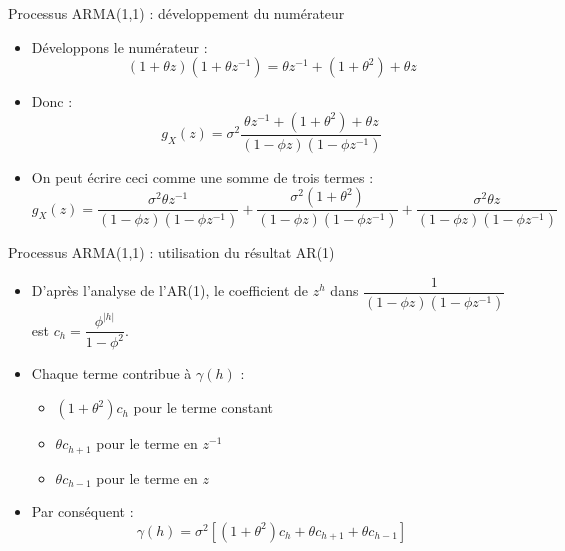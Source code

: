 \documentclass[11pt,aspectratio=169]{beamer}
\begin{document}
\begin{frame}{Processus ARMA(1,1) : développement du numérateur}

\begin{itemize}

\item Développons le numérateur :
  \[
  (1 + \theta z)(1 + \theta z^{-1}) = \theta z^{-1} + (1 + \theta^2) + \theta z
  \]\newline

\item Donc :
  \[
  g_X(z) = \sigma^2 \frac{\theta z^{-1} + (1 + \theta^2) + \theta z}{(1 - \phi z)(1 - \phi z^{-1})}
  \]\newline

\item On peut écrire ceci comme une somme de trois termes :
  \[
  g_X(z) = \frac{\sigma^2 \theta z^{-1}}{(1-\phi z)(1-\phi z^{-1})} + \frac{\sigma^2(1+\theta^2)}{(1-\phi z)(1-\phi z^{-1})} + \frac{\sigma^2 \theta z}{(1-\phi z)(1-\phi z^{-1})}
  \]

\end{itemize}

\end{frame}

\begin{frame}{Processus ARMA(1,1) : utilisation du résultat AR(1)}

\begin{itemize}

\item D'après l'analyse de l'AR(1), le coefficient de $z^h$ dans $\dfrac{1}{(1-\phi z)(1-\phi z^{-1})}$ est $c_h = \dfrac{\phi^{|h|}}{1-\phi^2}$.\newline

\item Chaque terme contribue à $\gamma(h)$ :
  \begin{itemize}
  \item $(1+\theta^2)c_h$ pour le terme constant\newline
  \item $\theta c_{h+1}$ pour le terme en $z^{-1}$\newline
  \item $\theta c_{h-1}$ pour le terme en $z$
  \end{itemize}

\item Par conséquent :
  \[
  \gamma(h) = \sigma^2 \left[ (1+\theta^2)c_h + \theta c_{h+1} + \theta c_{h-1} \right]
  \]

\end{itemize}

\end{frame}
\end{document}
